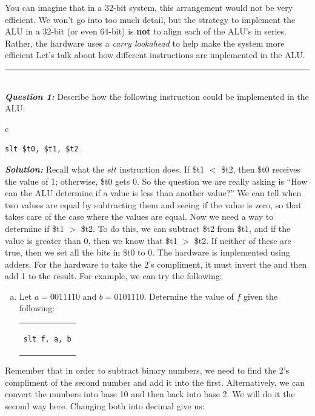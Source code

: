 \documentclass{article}
\begin{document}
\indent You can imagine that in a 32-bit system, this arrangement would not be very efficient. We won't go into too much detail, but the strategy to implement the ALU in a 32-bit (or even 64-bit) is \textbf{not} to align each of the ALU's in series. Rather, the hardware uses a \textit{carry lookahead} to help make the system more efficient Let's talk about how different instructions are implemented in the ALU.\\
\hrule
\noindent \\


\indent \textit{\textbf{Question 1:}} Describe how the following instruction could be implemented in the ALU:
\begin{center}
\begin{tabular}{c}
\begin{lstlisting}
slt $t0, $t1, $t2
\end{lstlisting}
\end{tabular}
\end{center}
\noindent \textit{\textbf{Solution:}} Recall what the $slt$ instruction does. If \$t1 $<$ \$t2, then \$t0 receives the value of 1; otherwise, \$t0 gets 0. So the question we are really asking is ``How can the ALU determine if a value is less than another value?'' We can tell when two values are equal by subtracting them and seeing if the value is zero, so that takes care of the case where the values are equal. Now we need a way to determine if \$t1 $>$ \$t2. To do this, we can subtract \$t2 from \$t1, and if the value is greater than $0$, then we know that \$t1 $>$ \$t2. If neither of these are true, then we set all the bits in \$t0 to 0. The hardware is implemented using adders. For the hardware to take the 2's compliment, it must invert the and then add 1 to the result. For example, we can try the following:
\begin{enumerate}[a)]
\item Let $a = 0011110$ and $b = 0101110$. Determine the value of $f$ given the following:
\begin{center}
\begin{tabular}{c}
\begin{lstlisting}
slt f, a, b
\end{lstlisting}
\end{tabular}
\end{center}
\end{enumerate}
\noindent Remember that in order to subtract binary numbers, we need to find the 2's compliment of the second number and add it into the first. Alternatively, we can convert the numbers into base 10 and then back into base 2. We will do it the second way here. Changing both into decimal give us:
\end{document}
